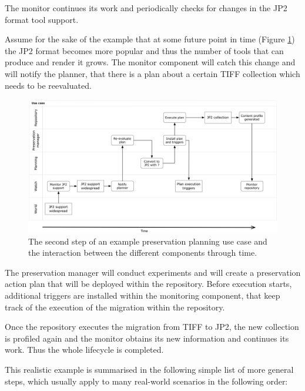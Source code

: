 The monitor continues its work and periodically checks for changes in the JP2 format tool support.

Assume for the sake of the example that at some future point in time (Figure \ref{fig:swimlane_step2}) the JP2 format becomes more popular and thus the number of tools that can produce and render it grows. The monitor component will catch this change and will notify the planner, that there is a plan about a certain TIFF collection which needs to be reevaluated.

\begin{figure}[th]
\begin{center}
\includegraphics[width=6in]{figures/related/swimlane_step2.png}
\caption{The second step of an example preservation planning use case and the interaction between the different components through time.}
\label{fig:swimlane_step2}
\end{center}
\end{figure}

The preservation manager will conduct experiments and will create a preservation action plan that will be deployed within the repository. Before execution starts, additional triggers are installed within the monitoring component, that keep track of the execution of the migration within the repository.

Once the repository executes the migration from TIFF to JP2, the new collection is profiled again and the monitor obtains its new information and continues its work. Thus the whole lifecycle is completed.

This realistic example is summarised in the following simple list of more general steps, which usually apply to many real-world scenarios in the following order:

